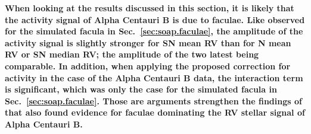 \documentclass{aa}
\begin{document}
{\bf When looking at the results discussed in this section, it is likely that the activity signal of Alpha Centauri B is due to faculae. 
Like observed for the simulated facula in Sec.~\ref{sec:soap.faculae}, the amplitude of the activity signal is slightly stronger for SN mean RV
than for N mean RV or SN median RV; the amplitude of the two latest being comparable. In addition, when applying the proposed correction for
activity in the case of the Alpha Centauri B data, the interaction term is significant, which was only the case for the simulated facula in 
Sec.~\ref{sec:soap.faculae}. Those are arguments strengthen the findings of \citet{Dumusque-2014c} that also found evidence for faculae
dominating the RV stellar signal of Alpha Centauri B.}
\end{document}
